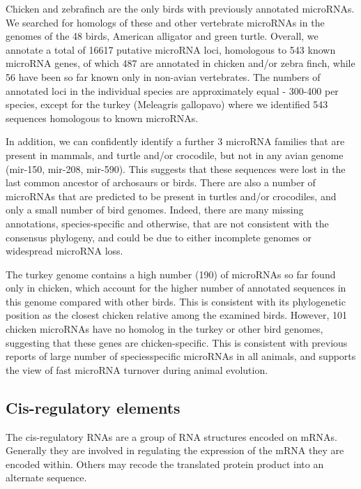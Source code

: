 \documentclass[10pt]{bmc_article}
\newenvironment{bmcformat}{\begin{raggedright}\baselineskip20pt\sloppy\setboolean{publ}{false}}{\end{raggedright}\baselineskip20pt\sloppy}
\begin{document}
\begin{bmcformat}
Chicken and zebrafinch are the only birds with previously annotated
microRNAs. We searched for homologs of these and other vertebrate
microRNAs in the genomes of the 48 birds, American alligator and green
turtle. Overall, we annotate a total of 16617 putative microRNA loci,
homologous to 543 known microRNA genes, of which 487 are annotated in
chicken and/or zebra finch, while 56 have been so far known only in
non-avian vertebrates. The numbers of annotated loci in the individual
species are approximately equal - 300-400 per species, except for the
turkey (Meleagris gallopavo) where we identified 543 sequences
homologous to known microRNAs.

In addition, we can confidently identify a further 3 microRNA
families that are present in mammals, and turtle and/or crocodile, but
not in any avian genome (mir-150, mir-208, mir-590). This suggests
that these sequences were lost in the last common ancestor of
archosaurs or birds. There are also a number of microRNAs that are
predicted to be present in turtles and/or crocodiles, and only a small
number of bird genomes. Indeed, there are many missing annotations,
species-specific and otherwise, that are not consistent with the
consensus phylogeny, and could be due to either incomplete genomes or
widespread microRNA loss.

The turkey genome contains a high number (190) of microRNAs so far
found only in chicken, which account for the higher number of
annotated sequences in this genome compared with other birds. This is
consistent with its phylogenetic position as the closest chicken
relative among the examined birds. However, 101 chicken microRNAs
have no homolog in the turkey or other bird genomes, suggesting that
these genes are chicken-specific. This is consistent with previous
reports of large number of speciesspecific microRNAs in all animals,
and supports the view of fast microRNA turnover during animal
evolution.

\subsection*{Cis-regulatory elements}

The cis-regulatory RNAs are a group of RNA structures encoded on
mRNAs. Generally they are involved in regulating the expression of the
mRNA they are encoded within. Others may recode the translated protein
product into an alternate sequence.


\end{bmcformat}
\end{document}
